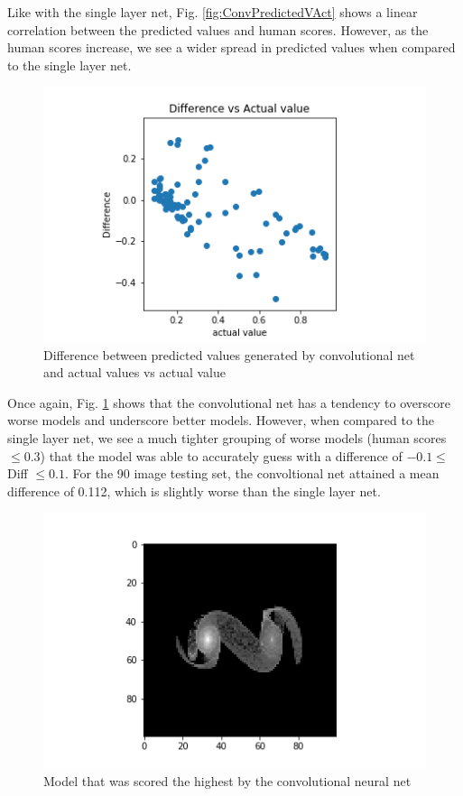 \documentclass[conference]{IEEEtran}
\begin{document}
Like with the single layer net, Fig. \ref{fig:ConvPredictedVAct} shows a linear correlation between the predicted values and human scores. However, as the human scores increase, we see a wider spread in predicted values when compared to the single layer net. 

\begin{figure}[htbp]
\centerline{\includegraphics[width=0.75\linewidth]{./Images/ConvDiffVAct.png}}
\caption{Difference between predicted values generated by convolutional net and actual values vs actual value}
\label{fig:ConvDiffVAct}
\end{figure}

Once again, Fig. \ref{fig:ConvDiffVAct} shows that the convolutional net has a tendency to overscore worse models and underscore better models. However, when compared to the single layer net, we see a much tighter grouping of worse models (human scores $\leq0.3$) that the model was able to accurately guess with a difference of $-0.1 \leq$ Diff $\leq 0.1$. For the 90 image testing set, the convoltional net attained a mean difference of 0.112, which is slightly worse than the single layer net. 

\begin{figure}[htbp]
\centerline{\includegraphics[width=0.75\linewidth]{./Images/ConvPredictedBest.png}}
\caption{Model that was scored the highest by the convolutional neural net}
\label{fig:ConvPredictedBest}
\end{figure}
\end{document}
